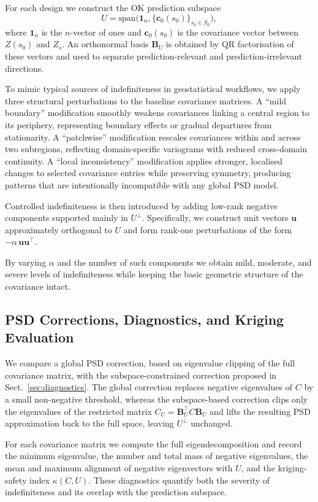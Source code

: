 \documentclass[smallextended]{svjour3}
\newcommand{\1}{\mathbf{1}}
\begin{document}
For each design we construct the OK prediction subspace
\[
U = \mathrm{span}\bigl(\mathbf{1}_n,\{\mathbf{c}_0(s_0)\}_{s_0\in S_0}\bigr),
\]
where $\mathbf{1}_n$ is the $n$-vector of ones and $\mathbf{c}_0(s_0)$ is the covariance vector between $Z(s_0)$ and $Z_s$. An orthonormal basis $\mathbf{B}_U$ is obtained by QR factorisation of these vectors and used to separate prediction-relevant and prediction-irrelevant directions.

To mimic typical sources of indefiniteness in geostatistical workflows, we apply three structural perturbations to the baseline covariance matrices. 
A ``mild boundary'' modification smoothly weakens covariances linking a central region to its periphery, representing boundary effects or gradual departures from stationarity. A ``patchwise'' modification rescales
covariances within and across two subregions, reflecting domain-specific variograms with reduced cross-domain continuity. A ``local inconsistency'' modification applies stronger, localised changes to selected covariance
entries while preserving symmetry, producing patterns that are intentionally incompatible with any global PSD model.

Controlled indefiniteness is then introduced by adding low-rank negative components supported mainly in $U^\perp$. Specifically, we construct unit vectors $\mathbf{u}$ approximately orthogonal to $U$ and form rank-one perturbations of the form $-\alpha\,\mathbf{u}\mathbf{u}^\top$.

By varying $\alpha$ and the number of such components we obtain mild, moderate, and severe levels of indefiniteness while keeping the basic geometric structure of the covariance intact.

\subsection{PSD Corrections, Diagnostics, and Kriging Evaluation}

We compare a global PSD correction, based on eigenvalue clipping of the full covariance matrix, with the subspace-constrained correction proposed in Sect.~\ref{sec:diagnostics}. The global correction replaces negative
eigenvalues of $C$ by a small non-negative threshold, whereas the subspace-based correction clips only the eigenvalues of the restricted matrix $C_U = \mathbf{B}_U^\top C \mathbf{B}_U$ and lifts the resulting PSD approximation back to the full space, leaving $U^\perp$ unchanged.

For each covariance matrix we compute the full eigendecomposition and record the minimum eigenvalue, the number and total mass of negative eigenvalues, the mean and maximum alignment of negative eigenvectors with $U$, and the kriging-safety index $\kappa(C,U)$. These diagnostics quantify both the severity of indefiniteness and its overlap with the prediction subspace.
\end{document}
